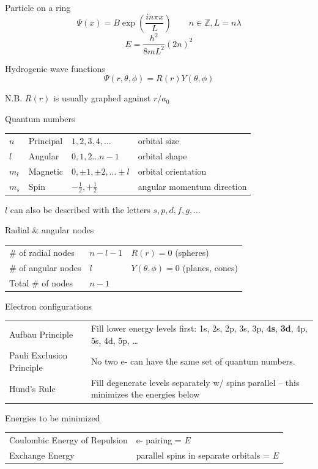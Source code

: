 \documentclass[10pt,landscape]{article}
\newcommand{\extraline}{\vspace{1em}}
\newcommand{\tableindent}{\hspace{1.5em}}
\begin{document}
\begin{multicols}{3}
Particle on a ring
\[ \Psi(x) = B \exp \left(\frac{in\pi x}{L} \right)
\qquad n \in \mathbb{Z}, L = n\lambda  \]
\[ E = \frac{h^2}{8mL^2} (2n)^2 \]

Hydrogenic wave functions
\[ \Psi(r,\theta,\phi) = R(r) Y(\theta,\phi) \]

\tableindent N.B. $R(r)$ is usually graphed against $r/a_0$


Quantum numbers 
\begin{tabular}{@{\tableindent}lllp{2.5cm}@{}}
$n$ & Principal & $1, 2, 3, 4, \ldots $ & \scriptsize{orbital size} \\
$l$ & Angular & $0, 1, 2 \dots  n-1 $ & \scriptsize{orbital shape} \\
$m_l$ & Magnetic & $0, \pm 1, \pm 2, \ldots \pm l $ & \scriptsize{orbital orientation} \\
$m_s$ & Spin & $-\frac{1}{2}, +\frac{1}{2} $ &  \scriptsize{angular momentum direction} \\
\end{tabular}

\extraline
\tableindent $l$ can also be described with the letters $s, p, d, f, g, \ldots$
\extraline

Radial \& angular nodes

\begin{tabular}{@{\tableindent}llp{2.4cm}@{}}
\# of radial nodes & $n-l-1$ & $R(r) = 0$ \scriptsize{(spheres)}\\
\# of angular nodes & $l$ &  $Y(\theta,\phi)=0$ \scriptsize{(planes, cones)} \\
Total \# of nodes & $n-1$ & 
\end{tabular}
\extraline

Electron configurations

\begin{tabular}{@{\tableindent}p{2.5cm}p{4.5cm}@{}}
Aufbau Principle & Fill lower energy levels first: 1s, 2s, 2p, 3s, 3p, \textbf{4s}, \textbf{3d}, 4p, 5s, 4d, 5p, \ldots\\
Pauli Exclusion Principle & No two e- can have the same set of quantum numbers. \\
Hund's Rule & Fill degenerate levels separately w/ spins parallel -- this minimizes the energies below \\
\end{tabular}
\extraline

Energies to be minimized

\begin{tabular}{@{\tableindent}p{25mm}p{47mm}@{}}
	Coulombic Energy of Repulsion & \textdownarrow{} e- pairing = \textdownarrow{} $E$ \\
	Exchange Energy & \textuparrow{} parallel spins in separate orbitals = \textdownarrow{} $E$
\end{tabular}



\end{multicols}
\end{document}
